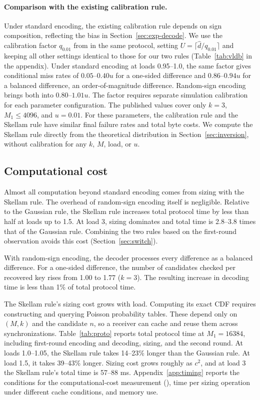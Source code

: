 \paragraph{Comparison with the existing calibration rule.}
Under standard encoding, the existing calibration rule depends on sign composition, reflecting the bias in Section~\ref{sec:exp-decode}. We use the calibration factor $q_{0.01}$ from \cite{wu2026selfsizing} in the same protocol, setting $U=\lceil\widehat d/q_{0.01}\rceil$ and keeping all other settings identical to those for our two rules (Table~\ref{tab:vldb} in the appendix). Under standard encoding at loads 0.95--1.0, the same factor gives conditional miss rates of $0.05$--$0.40u$ for a one-sided difference and $0.86$--$0.94u$ for a balanced difference, an order-of-magnitude difference. Random-sign encoding brings both into $0.80$--$1.01u$. The factor requires separate simulation calibration for each parameter configuration. The published values cover only $k=3$, $M_1\le4096$, and $u=0.01$. For these parameters, the calibration rule and the Skellam rule have similar final failure rates and total byte costs. We compute the Skellam rule directly from the theoretical distribution in Section~\ref{sec:inversion}, without calibration for any $k$, $M$, load, or $u$.

\subsection{Computational cost}\label{sec:exp-cost}
Almost all computation beyond standard encoding comes from sizing with the Skellam rule. The overhead of random-sign encoding itself is negligible. Relative to the Gaussian rule, the Skellam rule increases total protocol time by less than half at loads up to 1.5. At load 3, sizing dominates and total time is 2.8--3.8 times that of the Gaussian rule. Combining the two rules based on the first-round observation avoids this cost (Section~\ref{sec:switch}).

With random-sign encoding, the decoder processes every difference as a balanced difference. For a one-sided difference, the number of candidates checked per recovered key rises from 1.00 to 1.77 ($k=3$). The resulting increase in decoding time is less than 1\% of total protocol time.

The Skellam rule's sizing cost grows with load. Computing its exact CDF requires constructing and querying Poisson probability tables. These depend only on $(M,k)$ and the candidate $n$, so a receiver can cache and reuse them across synchronizations. Table~\ref{tab:proto} reports total protocol time at $M_1=16384$, including first-round encoding and decoding, sizing, and the second round. At loads 1.0--1.05, the Skellam rule takes 14--23\% longer than the Gaussian rule. At load 1.5, it takes 39--43\% longer. Sizing cost grows roughly as $c^2$, and at load 3 the Skellam rule's total time is 57--88 ms. Appendix~\ref{app:timing} reports the conditions for the computational-cost measurement (), time per sizing operation under different cache conditions, and memory use.

